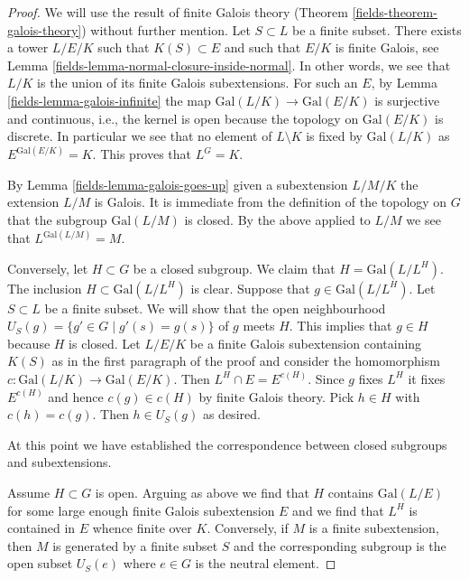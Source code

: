 \begin{proof}

We will use the result of finite Galois theory
(Theorem \ref{fields-theorem-galois-theory})
without further mention.
Let $S \subset L$ be a finite subset. There exists a tower
$L/E/K$ such that $K(S) \subset E$ and such that
$E/K$ is finite Galois, see Lemma \ref{fields-lemma-normal-closure-inside-normal}.
In other words, we see that $L/K$ is the union of its finite
Galois subextensions.
For such an $E$, by Lemma \ref{fields-lemma-galois-infinite}
the map $\text{Gal}(L/K) \to \text{Gal}(E/K)$ is surjective
and continuous, i.e., the kernel is open because the topology
on $\text{Gal}(E/K)$ is discrete.
In particular we see that no element of $L \setminus K$ is fixed by
$\text{Gal}(L/K)$ as $E^{\text{Gal}(E/K)} = K$.
This proves that $L^G = K$.

\medskip\noindent
By Lemma \ref{fields-lemma-galois-goes-up} given a subextension $L/M/K$
the extension $L/M$ is Galois. It is immediate from the definition
of the topology on $G$ that the subgroup $\text{Gal}(L/M)$ is closed.
By the above applied to $L/M$ we see that $L^{\text{Gal}(L/M)} = M$.

\medskip\noindent
Conversely, let $H \subset G$ be a closed subgroup. We claim that
$H = \text{Gal}(L/L^H)$. The inclusion $H \subset \text{Gal}(L/L^H)$
is clear. Suppose that $g \in \text{Gal}(L/L^H)$. Let $S \subset L$
be a finite subset. We will show that the open neighbourhood
$U_S(g) = \{g' \in G \mid g'(s) = g(s)\}$ of $g$ meets $H$.
This implies that $g \in H$ because $H$ is closed.
Let $L/E/K$ be a finite Galois subextension containing $K(S)$
as in the first paragraph of the proof and consider the homomorphism
$c : \text{Gal}(L/K) \to \text{Gal}(E/K)$.
Then $L^H \cap E = E^{c(H)}$. Since $g$ fixes $L^H$ it fixes
$E^{c(H)}$ and hence $c(g) \in c(H)$ by finite Galois theory.
Pick $h \in H$ with $c(h) = c(g)$. Then $h \in U_S(g)$ as desired.

\medskip\noindent
At this point we have established the correspondence between closed
subgroups and subextensions.

\medskip\noindent
Assume $H \subset G$ is open. Arguing as above we find that
$H$ contains $\text{Gal}(L/E)$ for some large enough finite
Galois subextension $E$ and we find that $L^H$ is contained
in $E$ whence finite over $K$. Conversely, if $M$ is a finite
subextension, then $M$ is generated by a finite subset $S$
and the corresponding subgroup is the open subset $U_S(e)$
where $e \in G$ is the neutral element.


\end{proof}
